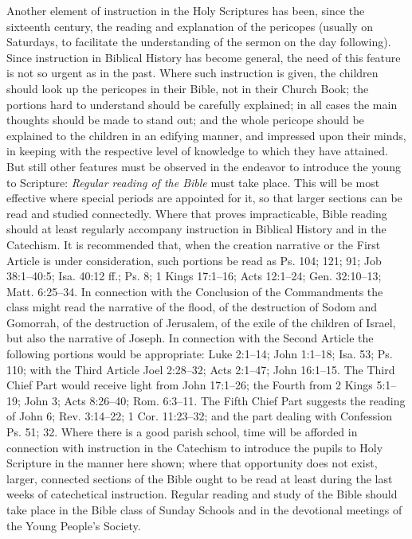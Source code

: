 Another element of instruction in the Holy Scriptures has been, since the sixteenth century, the reading and explanation of the pericopes (usually on Saturdays, to facilitate the understanding of the sermon on the day following). Since instruction in Biblical History has become general, the need of this feature is not so urgent as in the past. Where such instruction is given, the children should look up the pericopes in their Bible, not in their Church Book; the portions hard to understand should be carefully explained; in all cases the main thoughts should be made to stand out; and the whole pericope should be explained to the children in an edifying manner, and impressed upon their minds, in keeping with the respective level of knowledge to which they have attained. But still other features must be observed in the endeavor to introduce the young to Scripture: \emph{Regular reading of the Bible} must take place. This will be most effective where special periods are appointed for it, so that larger sections can be read and studied connectedly. Where that proves impracticable, Bible reading should at least regularly accompany instruction in Biblical History and in the Catechism. It is recommended that, when the creation narrative or the First Article is under consideration, such portions be read as Ps. 104; 121; 91; Job 38:1–40:5; Isa. 40:12 ff.; Ps. 8; 1 Kings 17:1–16; Acts 12:1–24; Gen. 32:10–13; Matt. 6:25–34. In connection with the Conclusion of the Commandments the class might read the narrative of the flood, of the destruction of Sodom and Gomorrah, of the destruction of Jerusalem, of the exile of the children of Israel, but also the narrative of Joseph. In connection with the Second Article the following portions would be appropriate: Luke 2:1–14; John 1:1–18; Isa. 53; Ps. 110; with the Third Article Joel 2:28–32; Acts 2:1–47; John 16:1–15. The Third Chief
Part would receive light from John 17:1–26; the Fourth from 2 Kings 5:1–19; John 3; Acts 8:26–40; Rom. 6:3–11. The Fifth Chief Part suggests the reading of John 6; Rev. 3:14–22; 1 Cor. 11:23–32; and the part dealing with Confession Ps. 51; 32. Where there is a good parish school, time will be afforded in connection with instruction in the Catechism to introduce the pupils to Holy Scripture in the manner here shown; where that opportunity does not exist, larger, connected sections of the Bible ought to be read at least during the last weeks of catechetical instruction. Regular reading and study of the Bible should take place in the Bible class of Sunday Schools and in the devotional meetings of the Young People’s Society.

